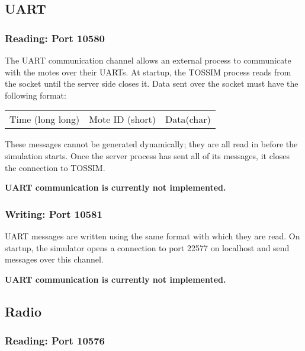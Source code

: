 \documentclass[12pt]{article}
\begin{document}
\subsection*{UART}

\subsubsection*{Reading: Port 10580}

The UART communication channel allows an external process to
communicate with the motes over their UARTs. At startup, the TOSSIM
process reads from the socket until the server side closes it. Data
sent over the socket must have the following format:

\vspace{0.1in}
\begin{tabular}{|c|c|c|}\hline
\hspace{4in} & \hspace{1in} & \hspace{0.5in} \\ \hline
Time (long long)& Mote ID (short) & Data(char) \\ \hline
\end{tabular}
\vspace{0.1in}

These messages cannot be generated dynamically; they are all read in
before the simulation starts. Once the server process has sent all of
its messages, it closes the connection to TOSSIM.

{\bf UART communication is currently not implemented.}

\subsubsection*{Writing: Port 10581}

UART messages are written using the same format with which they are
read. On startup, the simulator opens a connection to port 22577 on
localhost and send messages over this channel.

{\bf UART communication is currently not implemented.}

\subsection*{Radio}
\subsubsection*{Reading: Port 10576}
\end{document}
